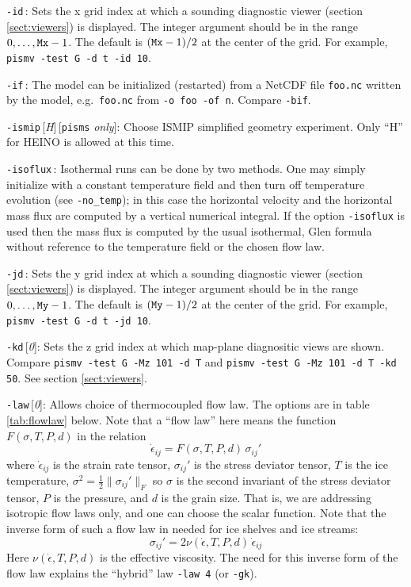 \documentclass[11pt,final]{amsart}
\renewcommand{\t}[1]{\texttt{#1}}
\newcommand{\eps}{\epsilon}
\newcommand{\rawopt}[1]{\vspace{1mm}\noindent \Large\texttt{-#1}\normalsize}
\newcommand{\opt}[1]{\rawopt{#1}\,:\quad}
\newcommand{\optdef}[2]{\rawopt{#1}\,[\textsl{#2}]:\quad}
\newcommand{\optdefrestrict}[3]{\rawopt{#1}\,[\textsl{#2}]\,[\texttt{#3} \textsl{only}]:\quad}
\begin{document}
\opt{id}  Sets the x grid index at which a sounding diagnostic viewer (section \ref{sect:viewers}) is displayed.  The integer argument should be in the range $0,\dots,\text{\t{Mx}}-1$.  The default is $(\text{\t{Mx}}-1)/2$ at the center of the grid.  For example, \verb|pismv -test G -d t -id 10|.

\opt{if}  The model can be initialized (restarted) from a NetCDF file \verb|foo.nc| written by the model, e.g.~\verb|foo.nc| from \verb|-o foo -of n|.  Compare \verb|-bif|.

\optdefrestrict{ismip}{H}{pisms}  Choose ISMIP simplified geometry experiment.  Only ``H'' for HEINO is allowed at this time.

\opt{isoflux}  Isothermal runs can be done by two methods.  One may simply initialize with a constant temperature field and then turn off temperature evolution (see \verb|-no_temp|); in this case the horizontal velocity and the horizontal mass flux are computed by a vertical numerical integral.  If the option \verb|-isoflux| is used then the mass flux is computed by the usual isothermal, Glen formula without reference to the temperature field or the chosen flow law.

\opt{jd}  Sets the y grid index at which a sounding diagnostic viewer (section \ref{sect:viewers}) is displayed.  The integer argument should be in the range $0,\dots,\text{\t{My}}-1$.  The default is $(\text{\t{My}}-1)/2$ at the center of the grid.  For example, \verb|pismv -test G -d t -jd 10|.

\optdef{kd}{0}  Sets the z grid index at which map-plane diagnositic views are shown.  Compare \verb|pismv -test G -Mz 101 -d T| and \verb|pismv -test G -Mz 101 -d T -kd 50|.  See section \ref{sect:viewers}.

\optdef{law}{0}  Allows choice of thermocoupled flow law.  The options are in table \ref{tab:flowlaw} below.  Note that a ``flow law'' here means the function $F(\sigma,T,P,d)$ in the relation
	$$\dot \eps_{ij} = F(\sigma,T,P,d)\, \sigma_{ij}'$$
where $\dot \eps_{ij}$ is the strain rate tensor, $\sigma_{ij}'$ is the stress deviator tensor, $T$ is the ice temperature, $\sigma^2 = \frac{1}{2} \|\sigma_{ij}'\|_F$ so $\sigma$ is the second invariant of the stress deviator tensor, $P$ is the pressure, and $d$ is the grain size.  That is, we are addressing isotropic flow laws only, and one can choose the scalar function.  Note that the inverse form of such a flow law in needed for ice shelves and ice streams:
	$$\sigma_{ij}' = 2 \nu(\dot\eps,T,P,d)\,\dot \eps_{ij} $$
Here $\nu(\dot \eps,T,P,d)$ is the effective viscosity.  The need for this inverse form of the flow law explains the ``hybrid'' law \verb|-law 4| (or \verb|-gk|).
\end{document}
